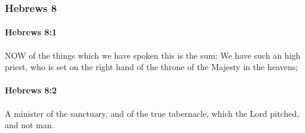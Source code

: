 	\subsubsection{Hebrews 8} %
		\label{HEBREWS-8}
		
		\paragraph{Hebrews 8:1} %
			\label{HEBREWS-8-1}

			NOW of the things which we have spoken this is the sum: We have such an high priest, who is set on the right hand of the throne of the Majesty in the heavens;

			\begin{framed}
			\scriptsize
				\begin{compactdesc}
					\item[SBLG] 
				\end{compactdesc}
			\end{framed}

		\paragraph{Hebrews 8:2} %
			\label{HEBREWS-8-2}

			A minister of the sanctuary, and of the true tabernacle, which the Lord pitched, and not man.

